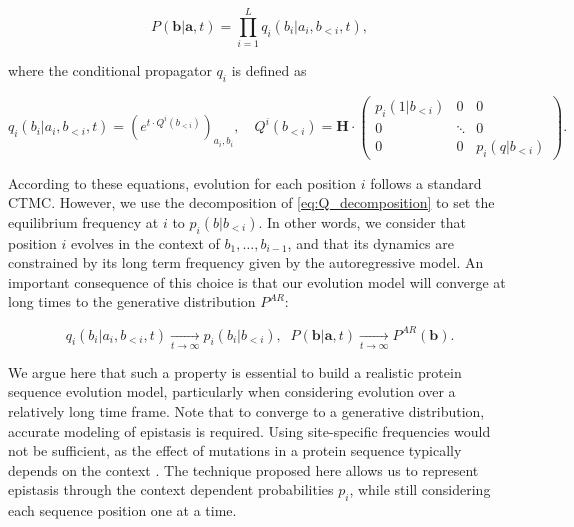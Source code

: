 \begin{equation}
	\label{eq:autoregressive_propagator_full}
	P(\mathbf{b} \vert \mathbf{a}, t) = \prod_{i=1}^L q_i(b_i \vert a_i, b_{<i}, t),
\end{equation}

where the conditional propagator $q_i$ is defined as 

\begin{equation}
	\label{eq:autoregressive_site_propagator}
	q_i(b_i \vert a_i, b_{<i}, t) = \left(e^{t \cdot Q^i(b_{<i})}\right)_{a_i, b_i}, 
	\quad Q^i(b_{<i}) = \mathbf{H} \cdot \begin{pmatrix}
		p_i(1 \vert b_{<i}) & 0 & 0\\ 
		0 & \ddots & 0 \\
		0 & 0 & p_i(q \vert b_{<i})
	\end{pmatrix}. 
\end{equation}

According to these equations, evolution for each position $i$ follows a standard CTMC. 
However, we use the decomposition of \eqref{eq:Q_decomposition} to set the equilibrium frequency at $i$ to $p_i(b \vert b_{<i})$. 
In other words, we consider that position $i$ evolves in the context of $b_1, \ldots, b_{i-1}$, and that its dynamics are constrained by its long term frequency given by the autoregressive model. 
An important consequence of this choice is that our evolution model will converge at long times to the generative distribution $P^{AR}$: 

\begin{equation}
	\label{eq:autoregressive_long_term}
	q_i(b_i \vert a_i, b_{<i}, t) \xrightarrow[t \rightarrow \infty]{} p_i(b_i \vert b_{<i}), 
	\;\; P(\mathbf{b} \vert \mathbf{a}, t) \xrightarrow[t \rightarrow \infty]{} P^{AR}(\mathbf{b}).
\end{equation}

We argue here that such a property is essential to build a realistic protein sequence evolution model, particularly when considering evolution over a relatively long time frame. 
Note that to converge to a generative distribution, accurate modeling of epistasis is required. 
Using site-specific frequencies would not be sufficient, as the effect of mutations in a protein sequence typically depends on the context \cite{socolich_evolutionaryinformationspecifying_2005}. 
The technique proposed here allows us to represent epistasis through the context dependent probabilities $p_i$, while still considering each sequence position one at a time. 

